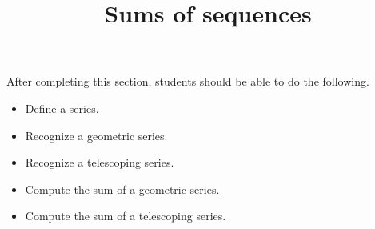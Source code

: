 \documentclass{ximera}
\title{Sums of sequences}
\begin{document}
\begin{abstract}
\end{abstract}

\maketitle

\begin{sectionOutcomes}

After completing this section, students should be able to do the following.

\begin{itemize}
\item Define a series.
\item Recognize a geometric series.
\item Recognize a telescoping series.
\item Compute the sum of a geometric series.
\item Compute the sum of a telescoping series.
\end{itemize}

\end{sectionOutcomes}
\end{document}
